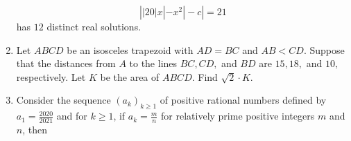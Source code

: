 \documentclass{article}
\begin{document}
\begin{enumerate}[label=\arabic*., itemsep=0.5em]
\begin{equation*}
\left||20|x|-x^2|-c\right|=21
\end{equation*}
has \(12\) distinct real solutions.\par \vspace{0.5em}\item Let \(ABCD\) be an isosceles trapezoid with \(AD=BC\) and \(AB<CD.\) Suppose that the distances from \(A\) to the lines \(BC,CD,\) and \(BD\) are \(15,18,\) and \(10,\) respectively. Let \(K\) be the area of \(ABCD.\) Find \(\sqrt2 \cdot K.\)\par \vspace{0.5em}\item Consider the sequence \((a_k)_{k\ge 1}\) of positive rational numbers defined by \(a_1 = \frac{2020}{2021}\) and for \(k\ge 1\), if \(a_k = \frac{m}{n}\) for relatively prime positive integers \(m\) and \(n\), then



\end{enumerate}
\end{document}
